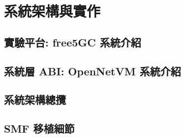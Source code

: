 \chapter{系統架構與實作}
\label{chapter:system}


\section{實驗平台: free5GC 系統介紹}
\label{subsec:system}

\section{系統層 ABI: OpenNetVM 系統介紹}
\label{subsec:system}

\section{系統架構總攬}
\label{subsec:system}

\section{SMF 移植細節}
\label{subsec:system}
